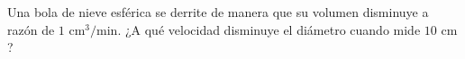 \item Una bola de nieve esférica se derrite de manera que su volumen disminuye a razón de $1 \text{ cm}^3/\text{min}$. ¿A qué velocidad disminuye el diámetro cuando mide $10 \text{ cm}$?
